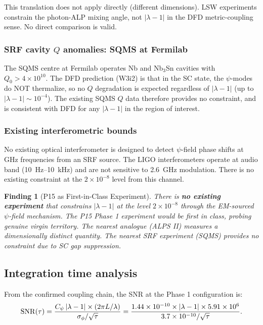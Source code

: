 \documentclass[11pt]{article}
\newtheorem{finding}{Finding}
\newcommand{\ee}[1]{\times 10^{#1}}
\newcommand{\lam}{\lambda}
\begin{document}
This translation does not apply directly (different dimensions). LSW experiments
constrain the photon-ALP mixing angle, not $|\lam-1|$ in the DFD metric-coupling
sense. No direct comparison is valid.

\subsubsection{SRF cavity $Q$ anomalies: SQMS at Fermilab}

The SQMS centre at Fermilab operates Nb and Nb$_3$Sn cavities with $Q_0 > 4\ee{10}$.
The DFD prediction (W3i2) is that in the SC state, the $\psi$-modes do NOT
thermalize, so no $Q$ degradation is expected regardless of $|\lam-1|$ (up to
$|\lam-1| \sim 10^{-4}$). The existing SQMS $Q$ data therefore provides no
constraint, and is consistent with DFD for any $|\lam-1|$ in the region of interest.

\subsubsection{Existing interferometric bounds}

No existing optical interferometer is designed to detect $\psi$-field phase shifts
at GHz frequencies from an SRF source. The LIGO interferometers operate at audio
band (10~Hz--10~kHz) and are not sensitive to 2.6~GHz modulation. There is no
existing constraint at the $2\ee{-8}$ level from this channel.

\begin{finding}[P15 as First-in-Class Experiment]
\label{find:first-in-class}
There is \textbf{no existing experiment} that constrains $|\lam-1|$ at the level
$2\ee{-8}$ through the EM-sourced $\psi$-field mechanism. The P15 Phase 1
experiment would be first in class, probing genuine virgin territory.
The nearest analogue (ALPS II) measures a dimensionally distinct quantity.
The nearest SRF experiment (SQMS) provides no constraint due to SC gap suppression.
\end{finding}

\subsection{Integration time analysis}

From the confirmed coupling chain, the SNR at the Phase 1 configuration is:
\begin{equation}
{\rm SNR}(\tau) = \frac{C_\psi\,|\lam-1| \times (2\pi L/\lambda)}
{\sigma_\phi / \sqrt{\tau}}
= \frac{1.44\ee{-10} \times |\lam-1| \times 5.91\ee{6}}{3.7\ee{-10}/\sqrt{\tau}}.
\end{equation}
\end{document}
